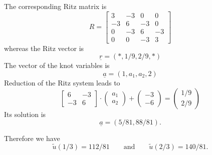 \begin{loesung}
\begin{teilaufgaben}
\item
The corresponding Ritz matrix is
\begin{equation}
R
=
\left[
\begin{array}{rrrr}
 3 & -3 &  0 &  0 \\
-3 &  6 & -3 &  0 \\
 0 & -3 &  6 & -3 \\
 0 &  0 & -3 &  3
\end{array}
\right]
\tag{\bf 1P}
\end{equation}
whereas the Ritz vector is
\begin{equation}
\underline{r} = (*,1/9,2/9,*)
\tag{\bf 1P}
\end{equation}
The vector of the knot variables is
\[
\underline{a}
=
(1, a_1, a_2, 2)
\]
Reduction of the Ritz system leads to  
\[
\left[
\begin{array}{rr}
  6 & -3 \\
 -3 &  6
\end{array}
\right]
\cdot
\left(
\begin{array}{r}
a_1 \\
a_2
\end{array}
\right)
+
\left(
\begin{array}{r}
-3 \\
-6
\end{array}
\right)
=
\left(
\begin{array}{r}
1/9 \\
2/9
\end{array}
\right)
\]
Its solution is
\[
\underline{a} = (5/81, 88/81). 
\]

Therefore we have
\begin{equation}
\tilde u(1/3) = 112/81
\qquad
\text{and}
\qquad
\tilde u(2/3) = 140/81.
\tag{\bf 1P}
\end{equation}


\end{teilaufgaben}
\end{loesung}
